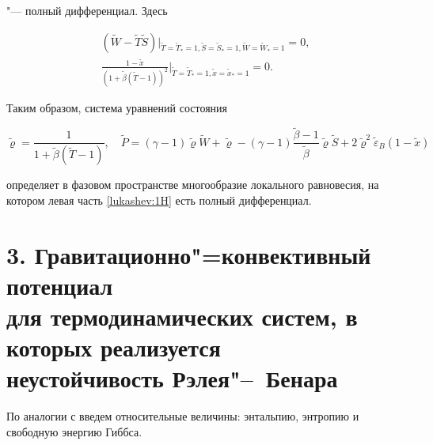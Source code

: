 "--- полный дифференциал. Здесь

\begin{gather}

\label{lukashev:odn}

(\widetilde{W}-\widetilde{T} \widetilde{S} )\big|_{\widetilde{T}=\widetilde{T}_*=1,\widetilde{S}=\widetilde{S}_*=1,\widetilde{W}=\widetilde{W}_*=1}=0, \\

\frac{1-\widetilde{x}}{(1+\widetilde{\beta} (\widetilde{T}-1))^2} \Big|_{\widetilde{T}=\widetilde{T}_*=1, \widetilde{x}=\widetilde{x}_*=1}=0.

\end{gather}



Таким образом, система уравнений состояния

\begin{equation}

\label{lukashev:UrSost}

\widetilde{\varrho}=\frac1{1+\widetilde{\beta}(\widetilde{T}-1)},\quad

\widetilde{P}=(\gamma-1)\widetilde{\varrho}\widetilde{W}+\widetilde{\varrho}-

(\gamma-1)\frac{\widetilde{\beta}-1}{\widetilde{\beta}} \widetilde{\varrho}

\widetilde{S} +2\widetilde{\varrho}^2 \widetilde{\varepsilon}_B 

(1-\widetilde{x})

\end{equation}

определяет в фазовом пространстве многообразие локального равновесия, на котором левая часть \eqref{lukashev:1H} есть полный дифференциал.



\pagebreak



\section*{\large 3. Гравитационно"=конвективный потенциал \\ \phantom{3.} для термодинамических систем, в которых реализуется \\ \phantom{3.} неустойчивость Рэлея"--~Бенара}



\indent 



По аналогии с \cite{lukashev:bib50} введем относительные величины: энтальпию, энтропию и свободную энергию Гиббса.

